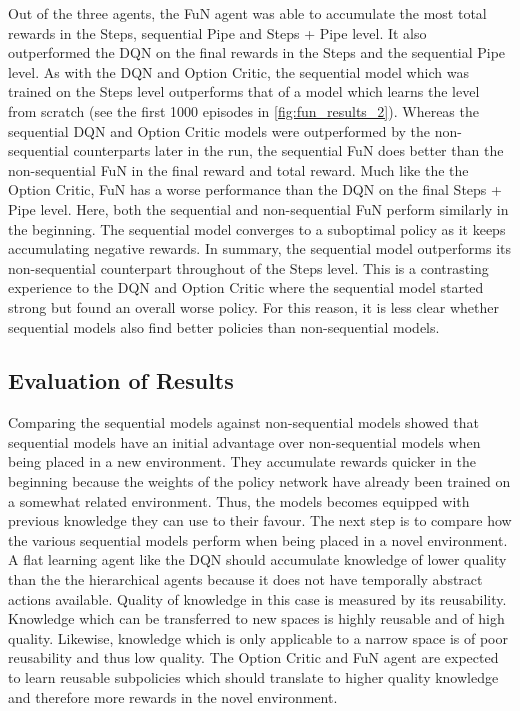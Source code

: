 \documentclass[notitlepage,a4paper,11pt]{article}
\begin{document}
Out of the three agents, the FuN agent was able to accumulate the most total rewards in the Steps, sequential Pipe and Steps + Pipe level. It also outperformed the DQN on the final rewards in the Steps and the sequential Pipe level. As with the DQN and Option Critic, the sequential model which was trained on the Steps level outperforms that of a model which learns the level from scratch (see the first 1000 episodes in \ref{fig:fun_results_2}). Whereas the sequential DQN and Option Critic models were outperformed by the non-sequential counterparts later in the run, the sequential FuN does better than the non-sequential FuN in the final reward and total reward. Much like the the Option Critic, FuN has a worse performance than the DQN on the final Steps + Pipe level. Here, both the sequential and non-sequential FuN perform similarly in the beginning. The sequential model converges to a suboptimal policy as it keeps accumulating negative rewards. In summary, the sequential model outperforms its non-sequential counterpart throughout of the Steps level. This is a contrasting experience to the DQN and Option Critic where the sequential model started strong but found an overall worse policy. For this reason, it is less clear whether sequential models also find better policies than non-sequential models.

\subsection{Evaluation of Results}
Comparing the sequential models against non-sequential models showed that sequential models have an initial advantage over non-sequential models when being placed in a new environment. They accumulate rewards quicker in the beginning because the weights of the policy network have already been trained on a somewhat related environment. Thus, the models becomes equipped with previous knowledge they can use to their favour. The next step is to compare how the various sequential models perform when being placed in a novel environment. A flat learning agent like the DQN should accumulate knowledge of lower quality than the the hierarchical agents because it does not have temporally abstract actions available. Quality of knowledge in this case is measured by its reusability. Knowledge which can be transferred to new spaces is highly reusable and of high quality. Likewise, knowledge which is only applicable to a narrow space is of poor reusability and thus low quality. The Option Critic and FuN agent are expected to learn reusable subpolicies which should translate to higher quality knowledge and therefore more rewards in the novel environment. 
\end{document}
